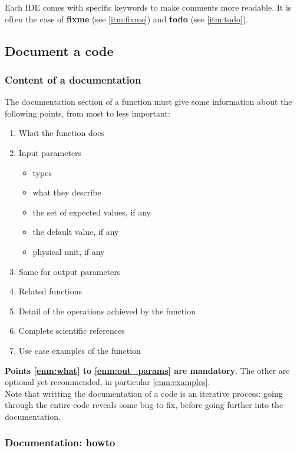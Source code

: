 \documentclass[11pt]{article}
\begin{document}
			Each IDE comes with specific keywords to make comments more readable. It is often the case of \textbf{fixme} (see \ref{itm:fixme}) and \textbf{todo} (see \ref{itm:todo}). \\

		\subsection{Document a code}

			\subsubsection{Content of a documentation}
				The documentation section of a function must give some information about the following points, from most to less important:
				\begin{enumerate}
					\label{enum:doc_content}
					\setlength\itemsep{0pt}
					\item What the function does  \label{enm:what}
					\item Input parameters
					\begin{itemize}
						\setlength\itemsep{0pt}
						\item types
						\item what they describe
						\item the set of expected values, if any
						\item the default value, if any
						\item physical unit, if any 
					\end{itemize}
					\item Same for output parameters \label{enm:out_params}
					\item Related functions 
					\item Detail of the operations achieved by the function
					\item Complete scientific references
					\item Use case examples of the function \label{enm:examples}
				\end{enumerate}
				\textbf{Points \ref{enm:what} to \ref{enm:out_params} are mandatory}.
				The other are optional yet recommended, in particular \ref{enm:examples}. \\
				Note that writting the documentation of a code is an iterative process: going through the entire code reveals some bug to fix, before going further into the documentation.

			\subsubsection{Documentation: howto}
\end{document}
